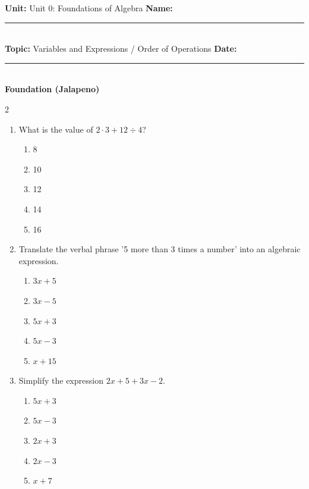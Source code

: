 \documentclass[10pt]{article}
\begin{document}
\enlargethispage{2.5cm}

\begin{tcolorbox}[colback=mainblue!5, colframe=mainblue, sharp corners, boxrule=0.5pt]
    \small \textbf{Unit:} Unit 0: Foundations of Algebra \hfill \textbf{Name:} \rule{3cm}{0.4pt} \\
    \small \textbf{Topic:} Variables and Expressions / Order of Operations \hfill \textbf{Date:} \rule{2cm}{0.4pt} \\
    \centering \textbf{\large Foundation (Jalapeno)}
\end{tcolorbox}

\vspace{0.2cm}

\begin{multicols}{2}
\begin{enumerate}[label=\textbf{Q\arabic*.}, leftmargin=*, itemsep=6pt, parsep=0pt]

  \item \small What is the value of $2 \cdot 3 + 12 \div 4$?
  \begin{enumerate}[label=(\Alph*), leftmargin=0.6cm, nosep, itemsep=2pt]
    \item 8
    \item 10
    \item 12
    \item 14
    \item 16
  \end{enumerate}

  \item \small Translate the verbal phrase '5 more than 3 times a number' into an algebraic expression.
  \begin{enumerate}[label=(\Alph*), leftmargin=0.6cm, nosep, itemsep=2pt]
    \item $3x + 5$
    \item $3x - 5$
    \item $5x + 3$
    \item $5x - 3$
    \item $x + 15$
  \end{enumerate}

  \item \small Simplify the expression $2x + 5 + 3x - 2$.
  \begin{enumerate}[label=(\Alph*), leftmargin=0.6cm, nosep, itemsep=2pt]
    \item $5x + 3$
    \item $5x - 3$
    \item $2x + 3$
    \item $2x - 3$
    \item $x + 7$
  \end{enumerate}


\end{enumerate}
\end{multicols}
\end{document}
